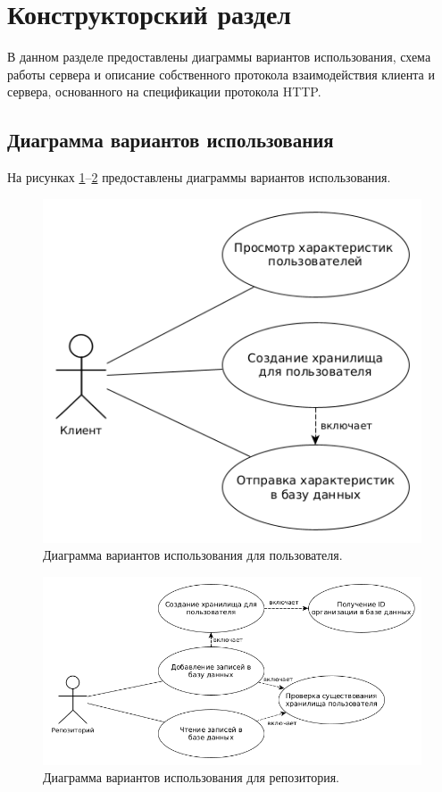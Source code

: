 \section{Конструкторский раздел}
В данном разделе предоставлены диаграммы вариантов использования, схема работы сервера и описание собственного протокола взаимодействия клиента и сервера, основанного на спецификации протокола HTTP.

\subsection{Диаграмма вариантов использования}
На рисунках \ref{fig:useCase}--\ref{fig:useCaseRepo} предоставлены диаграммы вариантов использования.

\begin{figure}[H]
	\centering
	\includegraphics[scale=0.5]{img/useCase.png}
	\caption{Диаграмма вариантов использования для пользователя. }
	\label{fig:useCase}
\end{figure}

\begin{figure}[H]
	\centering
	\includegraphics[scale=0.5]{img/useCaseServer.png}
	\caption{Диаграмма вариантов использования для репозитория. }
	\label{fig:useCaseRepo}
\end{figure}

